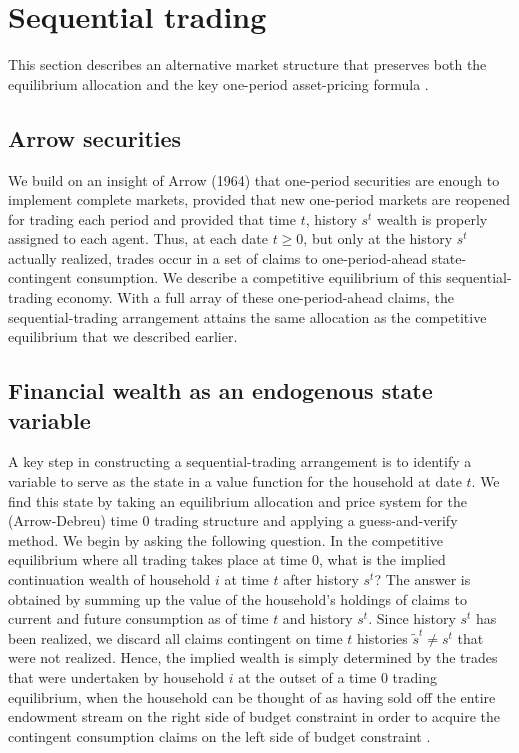 
\section{Sequential trading}\label{sec:arrowsecurities}%
This section describes an alternative
market structure that preserves both the  equilibrium  allocation
 and the  key one-period asset-pricing formula
.



\subsection{Arrow securities}
We build on an insight of Arrow (1964) that one-period securities
are enough to implement complete markets, provided that new
one-period  markets are reopened for trading each period and provided that time $t$, history $s^t$ wealth is properly assigned to each agent.
 Thus, at
each date  $t \geq 0$, but only at the history $s^t$ actually realized,  trades occur in a set of claims   to
one-period-ahead state-contingent consumption. We describe a
competitive equilibrium of this sequential-trading economy.
  With a full array of these one-period-ahead claims,
the sequential-trading arrangement attains the same allocation
as the competitive  equilibrium that we described earlier.



\subsection{Financial wealth as an endogenous state variable}
A key step in constructing a sequential-trading arrangement is to
identify a variable to serve as the state in a value function for
the household at date $t$. We find this state by taking an
equilibrium allocation and price system for the (Arrow-Debreu)
time $0$ trading structure and applying a guess-and-verify method.
We begin by asking the following question. In the competitive
equilibrium where all trading takes place at time $0$, what is the implied continuation wealth of household $i$ at time $t$ after history $s^t$?
The answer is obtained by summing up the value of the household's
holdings of claims to current and future consumption as of time $t$ and
history $s^t$. Since history $s^t$ has been realized, we discard all
claims contingent on time $t$ histories $\tilde s^t \neq s^t$ that
were not realized. Hence, the implied wealth is simply determined
by the trades that were undertaken by household $i$ at the outset of a
time $0$ trading equilibrium, when the household can be thought of as
having sold off the entire endowment stream on the right side of budget
constraint  in order to acquire the contingent consumption claims
on the left side of budget constraint .

